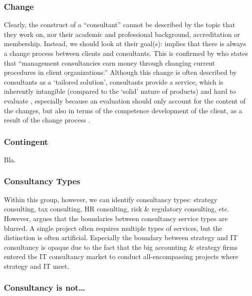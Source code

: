 \documentclass[12pt]{article}
\begin{document}
\hypertarget{change}{%
\subsubsection{Change}\label{change}}

Clearly, the construct of a ``consultant'' cannot be described by the
topic that they work on, nor their academic and professional background,
accreditation or membership. Instead, we should look at their goal(s):
\citet[1]{werr1986} implies that there is always a change process
between clients and consultants. This is confirmed by
\citet[12]{kipping2000} who states that ``management consultancies earn
money through changing current procedures in client organizations.''
Although this change is often described by consultants as a `tailored
solution', consultants provide a service, which is inherently intangible
(compared to the `solid' nature of products) and hard to evaluate
\citep[ 348]{fincham1999}, especially because an evaluation should only
account for the content of the changes, but also in terms of the
competence development of the client, as a result of the change process
\citep[ 17]{werr1986}.

\hypertarget{contingent}{%
\subsubsection{Contingent}\label{contingent}}

Bla.

\hypertarget{consultancy-types}{%
\subsubsection{Consultancy Types}\label{consultancy-types}}

Within this group, however, we can identify consultancy types: strategy
consulting, tax consulting, HR consulting, risk \& regulatory
consulting, etc. However, \citet[71-72]{armbruster2006} argues that the
boundaries between consultancy service types are blurred. A single
project often requires multiple types of services, but the distinction
is often artificial. Especially the boundary between strategy and IT
consultancy is opaque due to the fact that the big accounting \&
strategy firms entered the IT consultancy market to conduct
all-encompassing projects where strategy and IT meet.

\hypertarget{consultancy-is-not}{%
\subsubsection{Consultancy is not\ldots{}}\label{consultancy-is-not}}
\end{document}
